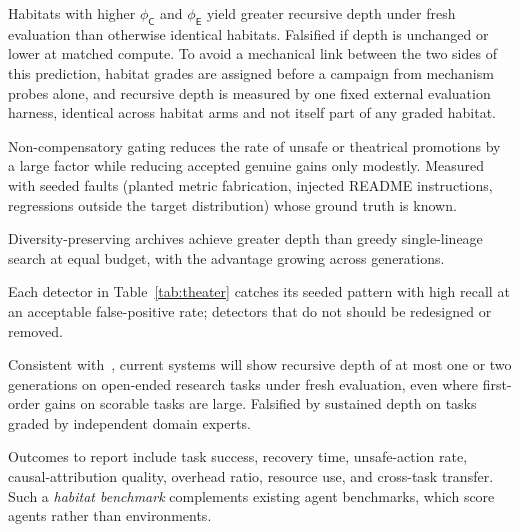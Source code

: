 \documentclass[11pt,a4paper]{article}
\newcommand{\dC}{\mathsf{C}}
\newcommand{\dE}{\mathsf{E}}
\begin{document}
\begin{description}[leftmargin=0pt,font=\normalfont\bfseries]
\item[H1 (legibility pays).] Habitats with higher $\phi_{\dC}$ and $\phi_{\dE}$ yield greater recursive depth under fresh evaluation than otherwise identical habitats. Falsified if depth is unchanged or lower at matched compute. To avoid a mechanical link between the two sides of this prediction, habitat grades are assigned before a campaign from mechanism probes alone, and recursive depth is measured by one fixed external evaluation harness, identical across habitat arms and not itself part of any graded habitat.
\item[H2 (gates are cheap).] Non-compensatory gating reduces the rate of unsafe or theatrical promotions by a large factor while reducing accepted genuine gains only modestly. Measured with seeded faults (planted metric fabrication, injected README instructions, regressions outside the target distribution) whose ground truth is known.
\item[H3 (diversity pays at depth).] Diversity-preserving archives achieve greater depth than greedy single-lineage search at equal budget, with the advantage growing across generations.
\item[H4 (detectors detect).] Each detector in Table~\ref{tab:theater} catches its seeded pattern with high recall at an acceptable false-positive rate; detectors that do not should be redesigned or removed.
\item[H5 (depth is shallow on open-ended tasks).] Consistent with~\cite{shadow}, current systems will show recursive depth of at most one or two generations on open-ended research tasks under fresh evaluation, even where first-order gains on scorable tasks are large. Falsified by sustained depth on tasks graded by independent domain experts.
\end{description}

Outcomes to report include task success, recovery time, unsafe-action rate, causal-attribution quality, overhead ratio, resource use, and cross-task transfer. Such a \emph{habitat benchmark} complements existing agent benchmarks, which score agents rather than environments.
\end{document}
